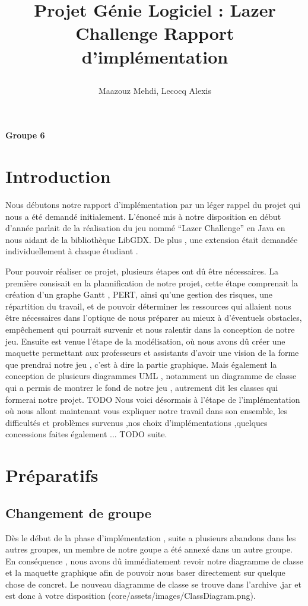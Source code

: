 \documentclass[a4paper,10pt]{article}
\title{
    \begin{minipage}\linewidth
        \centering\bfseries\sffamily
        Projet Génie Logiciel : Lazer Challenge
        \vskip3pt
        \large Rapport d'implémentation
    \end{minipage}
    }
\author{Maazouz Mehdi, Lecocq Alexis}
\begin{document}
\maketitle
\textbf{Groupe 6}
\tableofcontents
\newpage
\section{Introduction}
  Nous débutons notre rapport d'implémentation par un léger rappel du projet qui nous a été demandé initialement. 
L'énoncé mis à notre disposition en début d'année parlait de la réalisation du jeu nommé ``Lazer Challenge'' en Java
en nous aidant de la bibliothèque LibGDX. De plus , une extension était demandée individuellement à chaque étudiant .

Pour pouvoir réaliser ce projet, plusieurs étapes ont dû être nécessaires. La première consisait en la plannification de notre projet,
 cette étape comprenait la création d'un graphe Gantt , PERT, ainsi qu'une gestion des risques, une répartition du travail,
 et de pouvoir déterminer les ressources qui allaient nous être nécessaires dans l'optique de nous préparer au mieux à d'éventuels
 obstacles, empêchement qui pourrait survenir et nous ralentir dans la conception de notre jeu. Ensuite est venue l'étape de la modélisation, où nous
 avons dû créer une maquette permettant aux professeurs et assistants d'avoir une vision de la forme que prendrai notre jeu , c'est à dire la partie graphique.
 Mais également la conception de plusieurs diagrammes UML , notamment un diagramme de classe qui a permis de montrer le fond de notre jeu , autrement dit les classes
 qui formerai notre projet.
 TODO
 Nous voici désormais à l'étape de l'implémentation où nous allont maintenant vous expliquer notre travail dans son ensemble,
 les difficultés et problèmes survenus ,nos choix d'implémentations ,quelques concessions faites également ... TODO suite.
\section{Préparatifs}
\subsection{Changement de groupe} 
Dès le début de la phase d'implémentation , suite a plusieurs abandons dans les autres groupes, un membre de notre goupe a été annexé dans un autre groupe.
En conséquence , nous avons dû immédiatement revoir notre diagramme de classe et la maquette graphique afin de pouvoir nous baser directement sur quelque chose
de concret. Le nouveau diagramme de classe se trouve dans l'archive .jar et est donc à votre disposition (core/assets/images/ClassDiagram.png).
\end{document}
